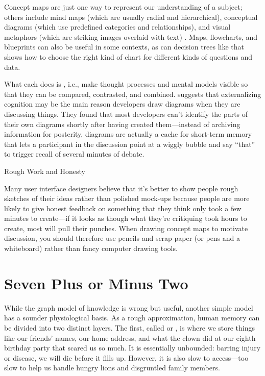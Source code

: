 Concept maps are just one way to represent our understanding of a
subject; others include mind maps (which are usually radial and
hierarchical), conceptual diagrams (which use predefined categories and
relationships), and visual metaphors (which are striking images overlaid
with text) \cite{Eppl2006}. Maps, flowcharts, and blueprints can also
be useful in some contexts, as can decision trees like
\cite{Abel2009} that shows how to choose the right kind of chart for
different kinds of questions and data.

What each does is ,
i.e., make thought processes and mental models visible so that they
can be compared, contrasted, and combined. \cite{Cher2007}
suggests that externalizing cognition may be the main reason
developers draw diagrams when they are discussing things. They found
that most developers can't identify the parts of their own diagrams
shortly after having created them---instead of archiving information
for posterity, diagrams are actually a cache for short-term memory
that lets a participant in the discussion point at a wiggly bubble and
say ``that'' to trigger recall of several minutes of debate.

\begin{aside}{Rough Work and Honesty}

Many user interface designers believe that it's better to show people
rough sketches of their ideas rather than polished mock-ups because
people are more likely to give honest feedback on something that they
think only took a few minutes to create---if it looks as though what
they're critiquing took hours to create, most will pull their punches.
When drawing concept maps to motivate discussion, you should therefore
use pencils and scrap paper (or pens and a whiteboard) rather than
fancy computer drawing tools.

\end{aside}

\section{Seven Plus or Minus Two}\label{s:memory-seven-plus-or-minus}

While the graph model of knowledge is wrong but useful, another simple
model has a sounder physiological basis. As a rough approximation,
human memory can be divided into two distinct layers. The first,
called  or , is where we store things like our
friends' names, our home address, and what the clown did at our eighth
birthday party that scared us so much. It is essentially unbounded:
barring injury or disease, we will die before it fills up. However,
it is also slow to access---too slow to help us handle hungry lions
and disgruntled family members.

